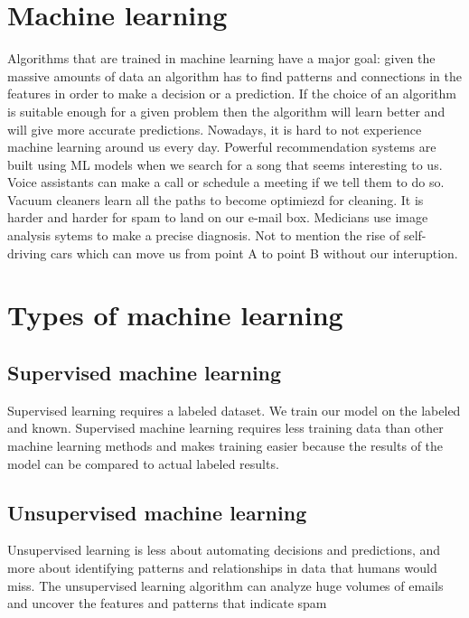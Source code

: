 \documentclass[a4paper,oneside,openright,11pt]{book}
\begin{document}
\section{Machine learning}

Algorithms that are trained in machine learning have a major goal: given the massive amounts of data an algorithm has to find patterns and connections in the features in order to make a decision or a prediction. If the choice of an algorithm is suitable enough for a given problem then the algorithm will learn better and will give more accurate predictions. Nowadays, it is hard to not experience machine learning around us every day. Powerful recommendation systems are built using ML models when we search for a song that seems interesting to us. Voice assistants can make a call or schedule a meeting if we tell them to do so. Vacuum cleaners learn all the paths to become optimiezd for cleaning. It is harder and harder for spam to land on our e-mail box. Medicians use image analysis sytems to make a precise diagnosis. Not to mention the rise of self-driving cars which can move us from point A to point B without our interuption. 


\section{Types of machine learning}

\subsection{Supervised machine learning}

Supervised learning requires a labeled dataset. We train our model on the labeled and known. Supervised machine learning requires less training data than other machine learning methods and makes training easier because the results of the model can be compared to actual labeled results.



\subsection{Unsupervised machine learning}

Unsupervised learning is less about automating decisions and predictions, and more about identifying patterns and relationships in data that humans would miss. The unsupervised learning algorithm can analyze huge volumes of emails and uncover the features and patterns that indicate spam 
\end{document}
